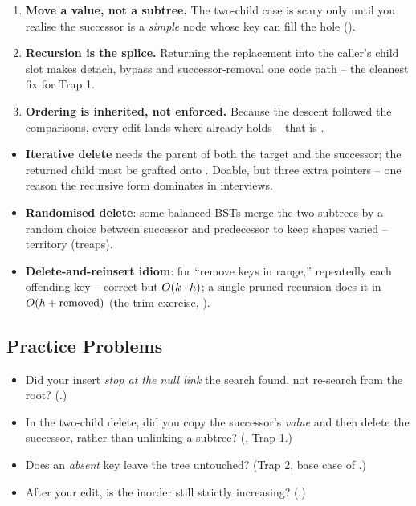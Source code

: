 \begin{insightbox}
\begin{enumerate}[nosep, leftmargin=1.6em]
  \item \textbf{Move a value, not a subtree.} The two-child case is scary only until you realise the
        successor is a \emph{simple} node whose key can fill the hole ().
  \item \textbf{Recursion is the splice.} Returning the replacement into the caller's child slot
        makes detach, bypass and successor-removal one code path -- the cleanest fix for Trap 1.
  \item \textbf{Ordering is inherited, not enforced.} Because the descent followed the comparisons,
        every edit lands where  already holds -- that is .
\end{enumerate}
\end{insightbox}

\begin{hardeningbox}
\begin{itemize}[nosep, leftmargin=1.4em]
  \item \textbf{Iterative delete} needs the parent of both the target and the successor; the returned
        child must be grafted onto . Doable, but three extra pointers -- one reason the
        recursive form dominates in interviews.
  \item \textbf{Randomised delete}: some balanced BSTs merge the two subtrees by a random choice
        between successor and predecessor to keep shapes varied --  territory (treaps).
  \item \textbf{Delete-and-reinsert idiom}: for ``remove keys in range,'' repeatedly 
        each offending key -- correct but $O(k\cdot h)$; a single pruned recursion does it in
        $O(h+\text{removed})$ (the trim exercise, ).
\end{itemize}
\end{hardeningbox}

\subsection{Practice Problems}

\begin{stuckbox}
\begin{itemize}[nosep, leftmargin=1.4em]
  \item Did your insert \emph{stop at the null link} the search found, not re-search from the root?
        (.)
  \item In the two-child delete, did you copy the successor's \emph{value} and then delete the
        successor, rather than unlinking a subtree? (, Trap 1.)
  \item Does an \emph{absent} key leave the tree untouched? (Trap 2, base case of .)
  \item After your edit, is the inorder still strictly increasing? (.)
\end{itemize}
\end{stuckbox}


